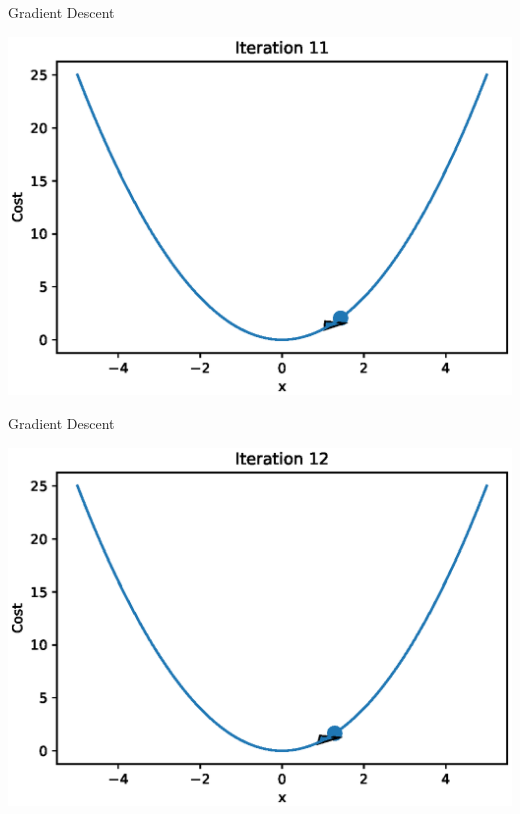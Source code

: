 \documentclass{beamer}
\begin{document}
\begin{frame}{Gradient Descent}
  \begin{center}
       \includegraphics[totalheight=6cm]{gradient-descent/iteration-11.eps}
   \end{center}
\end{frame}

\begin{frame}{Gradient Descent}
  \begin{center}
       \includegraphics[totalheight=6cm]{gradient-descent/iteration-12.eps}
   \end{center}
\end{frame}
\end{document}
